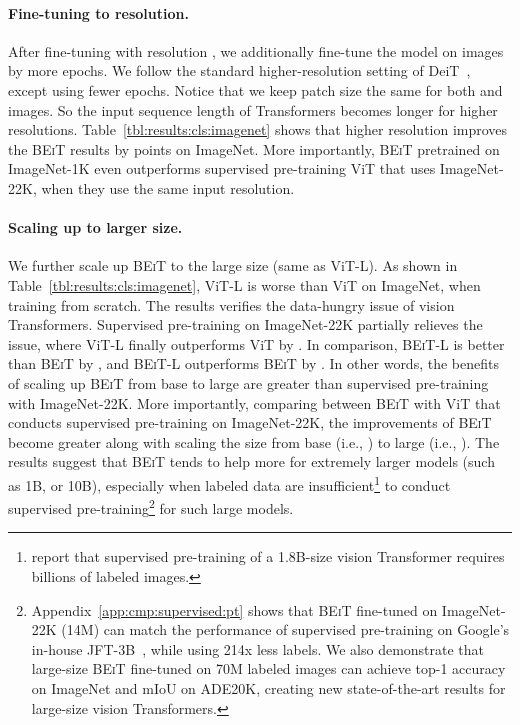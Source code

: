 \documentclass{article}
\newcommand\our{\textsc{BEiT}}
\begin{document}
\paragraph{Fine-tuning to  resolution.}
After fine-tuning with resolution , we additionally fine-tune the model on  images by  more epochs.
We follow the standard higher-resolution setting of DeiT~\citep{deit}, except using fewer epochs.
Notice that we keep patch size the same for both  and  images. So the input sequence length of Transformers becomes longer for higher resolutions.
Table~\ref{tbl:results:cls:imagenet} shows that higher resolution improves the \our{} results by  points on ImageNet.
More importantly, \our{} pretrained on ImageNet-1K even outperforms supervised pre-training ViT that uses ImageNet-22K, when they use the same input resolution.


\paragraph{Scaling up to larger size.}
We further scale up \our{} to the large size (same as ViT-L).
As shown in Table~\ref{tbl:results:cls:imagenet}, ViT-L is worse than ViT on ImageNet, when training from scratch. The results verifies the data-hungry issue of vision Transformers.
Supervised pre-training on ImageNet-22K partially relieves the issue, where ViT-L finally outperforms ViT by .
In comparison, \our{}-L is better than \our{} by , and \our{}-L outperforms \our{} by .
In other words, the benefits of scaling up \our{} from base to large are greater than supervised pre-training with ImageNet-22K.
More importantly, comparing between \our{} with ViT that conducts supervised pre-training on ImageNet-22K, the improvements of \our{} become greater along with scaling the size from base (i.e., ) to large (i.e., ).
The results suggest that \our{} tends to help more for extremely larger models (such as 1B, or 10B), especially when labeled data are insufficient\footnote{\citep{scaling:vit} report that supervised pre-training of a 1.8B-size vision Transformer requires billions of labeled images.} to conduct supervised pre-training\footnote{Appendix~\ref{app:cmp:supervised:pt} shows that \our{} fine-tuned on ImageNet-22K (14M) can match the performance of supervised pre-training on Google's in-house JFT-3B~\citep{scaling:vit}, while using 214x less labels. We also demonstrate that large-size \our{} fine-tuned on 70M labeled images can achieve  top-1 accuracy on ImageNet and  mIoU on ADE20K, creating new state-of-the-art results for large-size vision Transformers.} for such large models.
\end{document}

